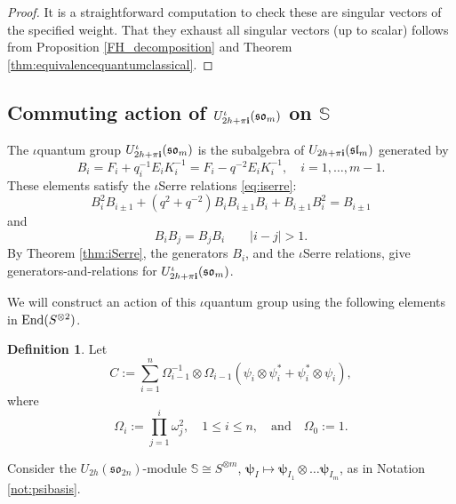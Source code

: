 \documentclass[10pt]{amsart}
\numberwithin{equation}{section}
\theoremstyle{definition}
\newtheorem{definition}[theorem]{Definition}
\newcommand{\End}{{\rm End}}
\newcommand{\slm}{\mathfrak{sl}_{m}}
\newcommand{\son}[1][2n]{\mathfrak{so}_{#1}}
\newcommand{\som}[1][m]{\mathfrak{so}_{#1}}
\newcommand{\ot}{\otimes}
\newcommand{\hwp}{\boldsymbol{\psi}}
\newcommand{\howespin}{\boldsymbol{\mathbb{S}}}
\begin{document}
\begin{proof}
    It is a straightforward computation to check these are singular vectors of the specified weight. That they exhaust all singular vectors (up to scalar) follows from Proposition \ref{FH_decomposition} and Theorem \ref{thm:equivalencequantumclassical}.
\end{proof}

\subsection{Commuting action of $U_{2h+\pi {\bf i}}^{\iota}(\som)$ on $\howespin$}

The $\iota$quantum group $U^{\iota}_{2h+\pi {\bf i}}(\mathfrak{so}_m)$ is the subalgebra of $U_{2h+\pi {\bf i}}(\slm)$ generated by 
    \begin{equation}\label{eq:quantumBigenerators}
        B_i=F_i+q^{-1}_iE_iK_i^{-1}=F_i-q^{-2}E_iK_i^{-1}, \quad i=1, \dots, m-1.
    \end{equation}
    These elements satisfy the $\iota$Serre relations \eqref{eq:iserre}:
    \begin{equation}
    B_i^2B_{i\pm 1} + (q^2+q^{-2})B_iB_{i\pm 1}B_i +B_{i\pm 1}B_i^2 = B_{i\pm 1}
    \end{equation}
    and 
    \begin{equation}
    B_iB_j=B_jB_i \qquad |i-j|> 1.
    \end{equation}
    By Theorem \ref{thm:iSerre}, the generators $B_i$, and the $\iota$Serre relations, give generators-and-relations for $U^{\iota}_{2h+\pi {\bf i}}(\mathfrak{so}_m)$.

We will construct an action of this $\iota$quantum group using the following elements in $\End(S^{\otimes 2})$.
\begin{definition}
Let
\begin{equation*}
    C:=\sum_{i=1}^n \Omega_{i-1}^{-1}\otimes\Omega_{i-1}(\psi_i \otimes \psi_i^{*}+\psi_i^{*}\otimes \psi_i),
\end{equation*}
where
\begin{equation*}
    \Omega_i :=\prod_{j=1}^{i}\omega_j^2, \quad 1\le i\le n, \quad \text{and} \quad \Omega_0:=1.
\end{equation*}
\end{definition}

Consider the $U_{2h}(\son)$-module $\howespin\cong S^{\ot m}$, $\hwp_I\mapsto \hwp_{I_1}\otimes \dots \hwp_{I_m}$, as in Notation \ref{not:psibasis}. 
\end{document}
